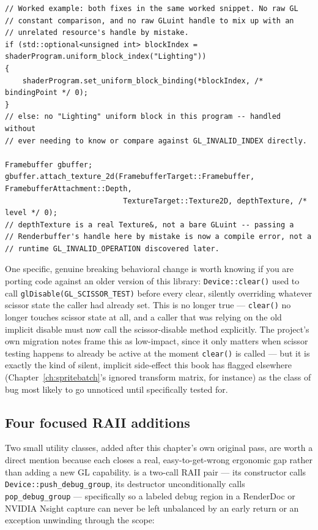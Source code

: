 \begin{lstlisting}
// Worked example: both fixes in the same worked snippet. No raw GL
// constant comparison, and no raw GLuint handle to mix up with an
// unrelated resource's handle by mistake.
if (std::optional<unsigned int> blockIndex = shaderProgram.uniform_block_index("Lighting"))
{
    shaderProgram.set_uniform_block_binding(*blockIndex, /* bindingPoint */ 0);
}
// else: no "Lighting" uniform block in this program -- handled without
// ever needing to know or compare against GL_INVALID_INDEX directly.

Framebuffer gbuffer;
gbuffer.attach_texture_2d(FramebufferTarget::Framebuffer, FramebufferAttachment::Depth,
                           TextureTarget::Texture2D, depthTexture, /* level */ 0);
// depthTexture is a real Texture&, not a bare GLuint -- passing a
// Renderbuffer's handle here by mistake is now a compile error, not a
// runtime GL_INVALID_OPERATION discovered later.
\end{lstlisting}

One specific, genuine breaking behavioral change is worth knowing if you are porting code
against an older version of this library: \texttt{Device::clear()} used to call
\texttt{glDisable(GL\_SCISSOR\_TEST)} before every clear, silently overriding whatever scissor
state the caller had already set. This is no longer true --- \texttt{clear()} no longer
touches scissor state at all, and a caller that was relying on the old implicit disable must
now call the scissor-disable method explicitly. The project's own migration notes frame this
as low-impact, since it only matters when scissor testing happens to already be active at the
moment \texttt{clear()} is called --- but it is exactly the kind of silent, implicit
side-effect this book has flagged elsewhere (Chapter~\ref{ch:spritebatch}'s ignored transform
matrix, for instance) as the class of bug most likely to go unnoticed until specifically
tested for.

\subsection{Four focused RAII additions}

Two small utility classes, added after this chapter's own original pass, are worth a direct
mention because each closes a real, easy-to-get-wrong ergonomic gap rather than adding a new
GL capability.  is a two-call RAII pair --- its constructor calls
\texttt{Device::push\_debug\_group}, its destructor unconditionally calls
\texttt{pop\_debug\_group} --- specifically so a labeled debug region in a RenderDoc or NVIDIA
Nsight capture can never be left unbalanced by an early return or an exception unwinding
through the scope:

